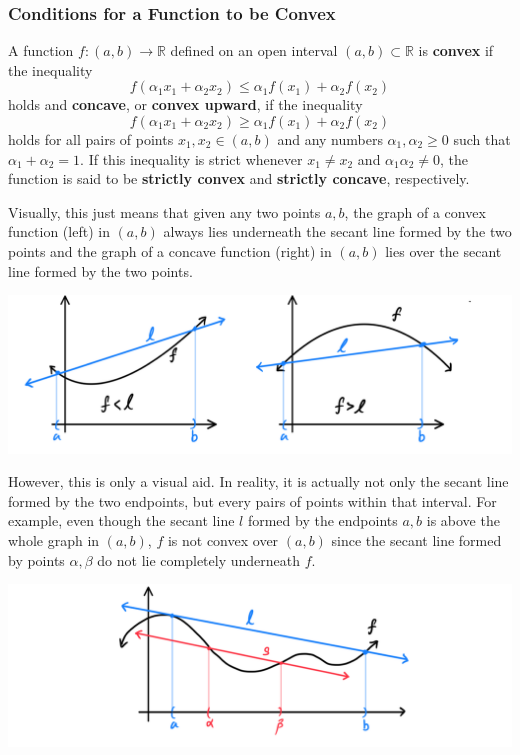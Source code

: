     \subsubsection{Conditions for a Function to be Convex}
    \begin{definition}
      A function $f: (a, b) \longrightarrow \mathbb{R}$ defined on an open interval $(a, b) \subset \mathbb{R}$ is \textbf{convex} if the inequality
      \[f( \alpha_1 x_1 + \alpha_2 x_2) \leq \alpha_1 f(x_1) + \alpha_2 f(x_2)\]
      holds and \textbf{concave}, or \textbf{convex upward}, if the inequality 
      \[f( \alpha_1 x_1 + \alpha_2 x_2) \geq \alpha_1 f(x_1) + \alpha_2 f(x_2)\]
      holds for all pairs of points $x_1, x_2 \in (a, b)$ and any numbers $\alpha_1, \alpha_2 \geq 0$ such that $\alpha_1 + \alpha_2 = 1$. If this inequality is strict whenever $x_1 \neq x_2$ and $\alpha_1 \alpha_2 \neq 0$, the function is said to be \textbf{strictly convex} and \textbf{strictly concave}, respectively. 

      Visually, this just means that given any two points $a, b$, the graph of a convex function (left) in $(a, b)$ always lies underneath the secant line formed by the two points and the graph of a concave function (right) in $(a, b)$ lies over the secant line formed by the two points. 
      \begin{center}
          \includegraphics[scale=0.25]{img/Convex_Concave_Functions_Secant.PNG}
      \end{center}
      However, this is only a visual aid. In reality, it is actually not only the secant line formed by the two endpoints, but every pairs of points within that interval. For example, even though the secant line $l$ formed by the endpoints $a, b$ is above the whole graph in $(a, b)$, $f$ is not convex over $(a, b)$ since the secant line formed by points $\alpha, \beta$ do not lie completely underneath $f$. 
      \begin{center}
          \includegraphics[scale=0.25]{img/Multiple_Secant_Lines_Convex_Clarification.PNG}
      \end{center}
    \end{definition}

